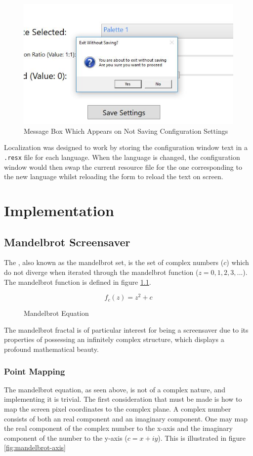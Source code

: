 \documentclass[10pt, openany]{book}
\begin{document}
\begin{figure}[H]
	\centering
	\includegraphics[width=.5\linewidth]{ExitWithoutSaving}
	\caption[Configuration Window Message Box]{Message Box Which Appears on Not Saving Configuration Settings}
\end{figure}	

Localization was designed to work by storing the configuration window text in a \texttt{.resx} file for each language. When the language is changed, the configuration window would then swap the current resource file for the one corresponding to the new language whilst reloading the form to reload the text on screen.

\chapter{Implementation}

\section{Mandelbrot Screensaver}

The , also known as the mandelbrot set, is the set of complex numbers ($c$) which do not diverge when iterated through the mandelbrot function ($z = 0, 1, 2, 3, ...$). The mandelbrot function is defined in figure \ref{fig:mandelbrot-equ}.

\begin{figure}[H]
	\centering
	\[ f_c(z) = z^2 + c \]
	\caption{Mandelbrot Equation}
	\label{fig:mandelbrot-equ}
\end{figure}	

The mandelbrot fractal is of particular interest for being a screensaver due to its properties of possessing an infinitely complex structure, which displays a profound mathematical beauty.

\subsection{Point Mapping}

The mandelbrot equation, as seen above, is not of a complex nature, and implementing it is trivial. The first consideration that must be made is how to map the screen pixel coordinates to the complex plane. A complex number consists of both an real component and an imaginary component. One may map the real component of the complex number to the x-axis and the imaginary component of the number to the y-axis ($c = x + iy$). This is illustrated in figure \ref{fig:mandelbrot-axis}
\end{document}
